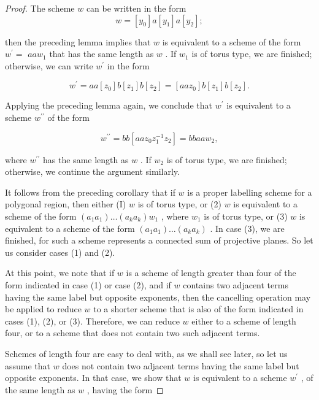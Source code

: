 \begin{proof}The scheme \(w\) can be written in the form
\[
w = \left\lbrack  {y}_{0}\right\rbrack  a\left\lbrack  {y}_{1}\right\rbrack  a\left\lbrack  {y}_{2}\right\rbrack  ;
\]

then the preceding lemma implies that \(w\) is equivalent to a scheme of the form \({w}^{\prime } =\)  \({aa}{w}_{1}\) that has the same length as \(w\) . If \({w}_{1}\) is of torus type, we are finished; otherwise, we can write \({w}^{\prime }\) in the form

\[
{w}^{\prime } = {aa}\left\lbrack  {z}_{0}\right\rbrack  b\left\lbrack  {z}_{1}\right\rbrack  b\left\lbrack  {z}_{2}\right\rbrack = \left\lbrack  {{aa}{z}_{0}}\right\rbrack  b\left\lbrack  {z}_{1}\right\rbrack  b\left\lbrack  {z}_{2}\right\rbrack  .
\]

Applying the preceding lemma again, we conclude that \({w}^{\prime }\) is equivalent to a scheme \({w}^{\prime \prime }\) of the form

\[
{w}^{\prime \prime } = {bb}\left\lbrack  {{aa}{z}_{0}{z}_{1}^{-1}{z}_{2}}\right\rbrack = {bbaa}{w}_{2},
\]

where \({w}^{\prime \prime }\) has the same length as \(w\) . If \({w}_{2}\) is of torus type, we are finished; otherwise, we continue the argument similarly.

It follows from the preceding corollary that if \(w\) is a proper labelling scheme for a polygonal region, then either (I) \(w\) is of torus type, or (2) \(w\) is equivalent to a scheme of the form \(\left( {{a}_{1}{a}_{1}}\right) \ldots \left( {{a}_{k}{a}_{k}}\right) {w}_{1}\) , where \({w}_{1}\) is of torus type, or (3) \(w\) is equivalent to a scheme of the form \(\left( {{a}_{1}{a}_{1}}\right) \ldots \left( {{a}_{k}{a}_{k}}\right)\) . In case (3), we are finished, for such a scheme represents a connected sum of projective planes. So let us consider cases (1) and (2).

At this point, we note that if \(w\) is a scheme of length greater than four of the form indicated in case (1) or case (2), and if \(w\) contains two adjacent terms having the same label but opposite exponents, then the cancelling operation may be applied to reduce \(w\) to a shorter scheme that is also of the form indicated in cases (1), (2), or (3). Therefore, we can reduce \(w\) either to a scheme of length four, or to a scheme that does not contain two such adjacent terms.

Schemes of length four are easy to deal with, as we shall see later, so let us assume that \(w\) does not contain two adjacent terms having the same label but opposite exponents. In that case, we show that \(w\) is equivalent to a scheme \({w}^{\prime }\) , of the same length as \(w\) , having the form


\end{proof}
